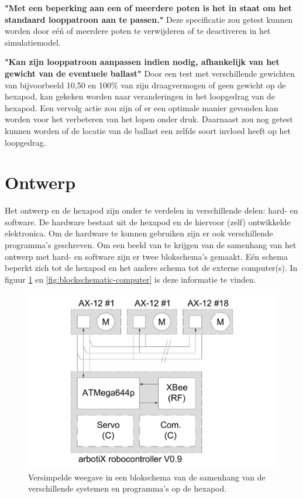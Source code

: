 \documentclass[10pt,a4paper]{article}
\begin{document}
\textbf{"Met een beperking aan een of meerdere poten is het in staat om het
standaard looppatroon aan te passen."} Deze specificatie zou getest kunnen worden door e\'e\'n of meerdere poten te verwijderen of te deactiveren in het simulatiemodel.

\textbf{"Kan zijn looppatroon aanpassen indien nodig, afhankelijk van het gewicht
van de eventuele ballast"} Door een test met verschillende gewichten van bijvoorbeeld 10,50 en 100\% van zijn draagvermogen of geen gewicht op de hexapod, kan gekeken worden naar veranderingen in het loopgedrag van de hexapod. Een vervolg actie zou zijn of er een optimale manier gevonden kan worden voor het verbeteren van het lopen onder druk. Daarnaast zou nog getest kunnen worden of de locatie van de ballast een zelfde soort invloed heeft op het loopgedrag.



\newpage

\section{Ontwerp}
Het ontwerp en de hexapod zijn onder te verdelen in verschillende delen: hard- en software. De hardware bestaat uit de hexapod en de hiervoor (zelf) ontwikkelde elektronica. Om de hardware te kunnen gebruiken zijn er ook verschillende programma's geschreven. Om een beeld van te krijgen van de samenhang van het ontwerp met hard- en software zijn er twee blokschema's gemaakt. E\'en schema beperkt zich tot de hexapod en het andere schema tot de externe computer(s). In figuur \ref{fig:blockschematic-spider} en \ref{fig:blockschematic-computer} is deze informatie te vinden.

\begin{figure}[h]
    \centering
    \includegraphics[width=1\textwidth]{blockschematic-spider}
    \caption{Versimpelde weegave in een blokschema van de samenhang van de verschillende systemen en programma's op de hexapod.}
    \label{fig:blockschematic-spider}
\end{figure}
\end{document}
